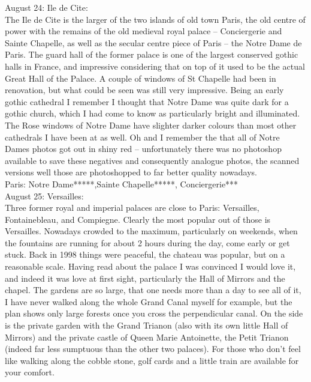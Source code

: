 August 24: Ile de Cite:\\
The Ile de Cite is the larger of the two islands of old town Paris, the old centre of power with the remains of the old medieval royal palace -- Conciergerie and Sainte Chapelle, as well as the secular centre piece of Paris -- the Notre Dame de Paris. The guard hall of the former palace is one of the largest conserved gothic halls in France, and impressive considering that on top of it used to be the actual Great Hall of the Palace. A couple of windows of St Chapelle had been in renovation, but what could be seen was still very impressive. Being an early gothic cathedral I remember I thought that Notre Dame was quite dark for a gothic church, which I had come to know as particularly bright and illuminated. The Rose windows of Notre Dame have slighter darker colours than most other cathedrals I have been at as well. Oh and I remember the that all of Notre Dames photos got out in shiny red -- unfortunately there was no photoshop available to save these negatives and consequently analogue photos, the scanned versions well those are photoshopped to far better quality nowadays.\\ 

Paris: Notre Dame*****,Sainte Chapelle*****, Conciergerie***\\

August 25: Versailles:\\
Three former royal and imperial palaces are close to Paris: Versailles, Fontainebleau, and Compiegne. Clearly the most popular out of those is Versailles. Nowadays crowded to the maximum, particularly on weekends, when the fountains are running for about 2 hours during the day, come early or get stuck. Back in 1998 things were peaceful, the chateau was popular, but on a reasonable scale. Having read about the palace I was convinced I would love it, and indeed it was love at first sight, particularly the Hall of Mirrors and the chapel. The gardens are so large, that one needs more than a day to see all of it, I have never walked along the whole Grand Canal myself for example, but the plan shows only large forests once you cross the perpendicular canal. On the side is the private garden with the Grand Trianon (also with its own little Hall of Mirrors) and the private castle of Queen Marie Antoinette, the Petit Trianon (indeed far less sumptuous than the other two palaces). For those who don't feel like walking along the cobble stone, golf cards and a little train are available for your comfort.\\

